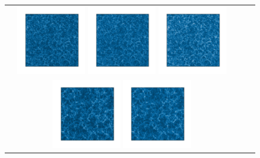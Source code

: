 \begin{figure}
 \begin{tabular}{ccc}
\includegraphics[width=0.3\textwidth]{figures/mocks/bigmd_large.pdf}
\includegraphics[width=0.3\textwidth]{figures/mocks/fastpm_large.pdf}
\includegraphics[width=0.3\textwidth]{figures/mocks/alpt_large.pdf}\\
\includegraphics[width=0.3\textwidth]{figures/mocks/bigmd_medium.pdf}
\includegraphics[width=0.3\textwidth]{figures/mocks/fastpm_medium.pdf}

\end{tabular}
\end{figure}
